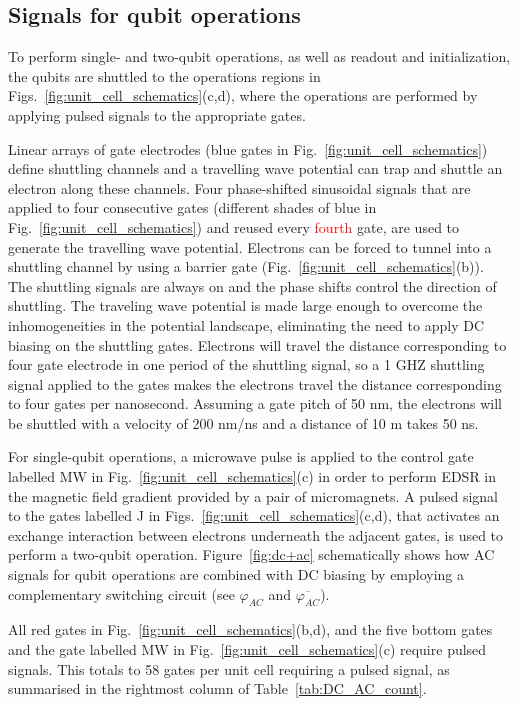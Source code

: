 \documentclass[aps,prl,reprint,superscriptaddress,floatfix]{revtex4-1}
\begin{document}
\subsection{Signals for qubit operations}

To perform single- and two-qubit operations, as well as readout and initialization, the qubits are shuttled to the operations regions in Figs.~\ref{fig:unit_cell_schematics}(c,d), where the operations are performed by applying pulsed signals to the appropriate gates.

Linear arrays of gate electrodes (blue gates in Fig.~\ref{fig:unit_cell_schematics}) define shuttling channels and a travelling wave potential can trap and shuttle an electron along these channels.
Four phase-shifted sinusoidal signals that are applied to four consecutive gates (different shades of blue in Fig.~\ref{fig:unit_cell_schematics}) and reused every \textcolor{red}{fourth} gate, are used to generate the travelling wave potential.
Electrons can be forced to tunnel into a shuttling channel by using a barrier gate (Fig.~\ref{fig:unit_cell_schematics}(b)).
The shuttling signals are always on and the phase shifts control the direction of shuttling.
The traveling wave potential is made large enough to overcome the inhomogeneities in the potential landscape, eliminating the need to apply DC biasing on the shuttling gates.
Electrons will travel the distance corresponding to four gate electrode in one period of the shuttling signal, so a 1 GHZ shuttling signal applied to the gates makes the electrons travel the distance corresponding to four gates per nanosecond.
Assuming a gate pitch of 50 nm, the electrons will be shuttled with a velocity of 200 nm/ns and a distance of 10 \textmu m takes 50 ns.

For single-qubit operations, a microwave pulse is applied to the control gate labelled MW in Fig.~\ref{fig:unit_cell_schematics}(c) in order to perform EDSR in the magnetic field gradient provided by a pair of micromagnets.
A pulsed signal to the gates labelled J in Figs.~\ref{fig:unit_cell_schematics}(c,d), that activates an exchange interaction between electrons underneath the adjacent gates, is used to perform a two-qubit operation.
Figure~\ref{fig:dc+ac} schematically shows how AC signals for qubit operations are combined with DC biasing by employing a complementary switching circuit (see $\varphi_{AC}$ and $\overline{\varphi_{AC}}$).

All red gates in Fig.~\ref{fig:unit_cell_schematics}(b,d), and the five bottom gates and the gate labelled MW in Fig.~\ref{fig:unit_cell_schematics}(c) require pulsed signals.
This totals to 58 gates per unit cell requiring a pulsed signal, as summarised in the rightmost column of Table~\ref{tab:DC_AC_count}.
\end{document}
